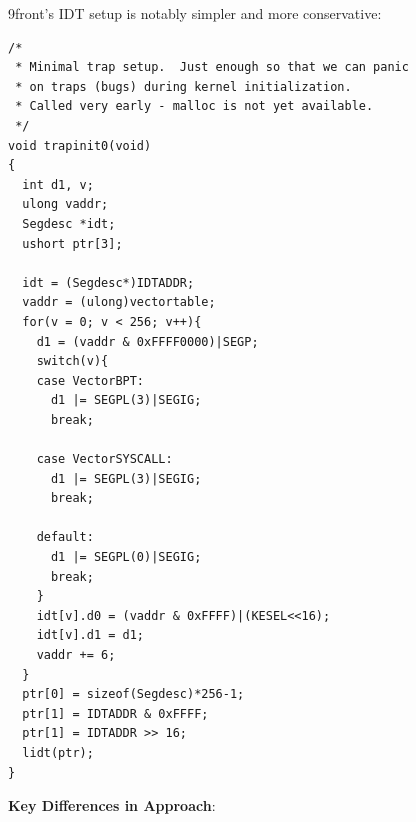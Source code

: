 \documentclass[11pt,letterpaper]{article}
\begin{document}
9front's IDT setup is notably simpler and more conservative:

\begin{lstlisting}
/*
 * Minimal trap setup.  Just enough so that we can panic
 * on traps (bugs) during kernel initialization.
 * Called very early - malloc is not yet available.
 */
void trapinit0(void)
{
  int d1, v;
  ulong vaddr;
  Segdesc *idt;
  ushort ptr[3];

  idt = (Segdesc*)IDTADDR;
  vaddr = (ulong)vectortable;
  for(v = 0; v < 256; v++){
    d1 = (vaddr & 0xFFFF0000)|SEGP;
    switch(v){
    case VectorBPT:
      d1 |= SEGPL(3)|SEGIG;
      break;

    case VectorSYSCALL:
      d1 |= SEGPL(3)|SEGIG;
      break;

    default:
      d1 |= SEGPL(0)|SEGIG;
      break;
    }
    idt[v].d0 = (vaddr & 0xFFFF)|(KESEL<<16);
    idt[v].d1 = d1;
    vaddr += 6;
  }
  ptr[0] = sizeof(Segdesc)*256-1;
  ptr[1] = IDTADDR & 0xFFFF;
  ptr[1] = IDTADDR >> 16;
  lidt(ptr);
}
\end{lstlisting}

\textbf{Key Differences in Approach}:
\end{document}
